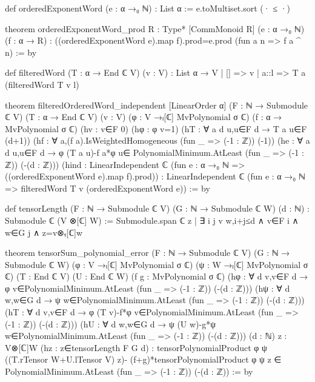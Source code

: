 \begin{leancode}
def orderedExponentWord (e : α →₀ ℕ) : List α :=
  e.toMultiset.sort (· ≤ ·)

theorem orderedExponentWord_prod {R : Type*} [CommMonoid R] (e : α →₀ ℕ) (f : α → R) :
    ((orderedExponentWord e).map f).prod=e.prod (fun a n => f a ^ n) := by

def filteredWord (T : α → End ℂ V) (v : V) : List α → V
  | [] => v
  | a::l => T a (filteredWord T v l)

theorem filteredOrderedWord_independent [LinearOrder α]
    (F : ℕ → Submodule ℂ V) (T : α → End ℂ V) (v : V)
    (φ : V →ₗ[ℂ] MvPolynomial σ ℂ) (f : α → MvPolynomial σ ℂ)
    (hv : v∈F 0) (hφ : φ v=1)
    (hT : ∀ a d u,u∈F d → T a u∈F (d+1))
    (hf : ∀ a,(f a).IsWeightedHomogeneous (fun _ => (-1 : ℤ)) (-1))
    (he : ∀ a d u,u∈F d → φ (T a u)-f a*φ u∈
      PolynomialMinimum.AtLeast (fun _ => (-1 : ℤ)) (-(d : ℤ)))
    (hind : LinearIndependent ℂ (fun e : α →₀ ℕ => ((orderedExponentWord e).map f).prod)) :
    LinearIndependent ℂ (fun e : α →₀ ℕ => filteredWord T v (orderedExponentWord e)) := by

def tensorLength (F : ℕ → Submodule ℂ V) (G : ℕ → Submodule ℂ W) (d : ℕ) :
    Submodule ℂ (V ⊗[ℂ] W) := Submodule.span ℂ
  {z | ∃ i j v w,i+j≤d ∧ v∈F i ∧ w∈G j ∧ z=v⊗ₜ[ℂ]w}

theorem tensorSum_polynomial_error (F : ℕ → Submodule ℂ V) (G : ℕ → Submodule ℂ W)
    (φ : V →ₗ[ℂ] MvPolynomial σ ℂ) (ψ : W →ₗ[ℂ] MvPolynomial σ ℂ)
    (T : End ℂ V) (U : End ℂ W) (f g : MvPolynomial σ ℂ)
    (hφ : ∀ d v,v∈F d → φ v∈PolynomialMinimum.AtLeast (fun _ => (-1 : ℤ)) (-(d : ℤ)))
    (hψ : ∀ d w,w∈G d → ψ w∈PolynomialMinimum.AtLeast (fun _ => (-1 : ℤ)) (-(d : ℤ)))
    (hT : ∀ d v,v∈F d → φ (T v)-f*φ v∈PolynomialMinimum.AtLeast (fun _ => (-1 : ℤ)) (-(d : ℤ)))
    (hU : ∀ d w,w∈G d → ψ (U w)-g*ψ w∈PolynomialMinimum.AtLeast (fun _ => (-1 : ℤ)) (-(d : ℤ)))
    (d : ℕ) {z : V⊗[ℂ]W} (hz : z∈tensorLength F G d) :
    tensorPolynomialProduct φ ψ ((T.rTensor W+U.lTensor V) z)-
        (f+g)*tensorPolynomialProduct φ ψ z ∈
      PolynomialMinimum.AtLeast (fun _ => (-1 : ℤ)) (-(d : ℤ)) := by
\end{leancode}

